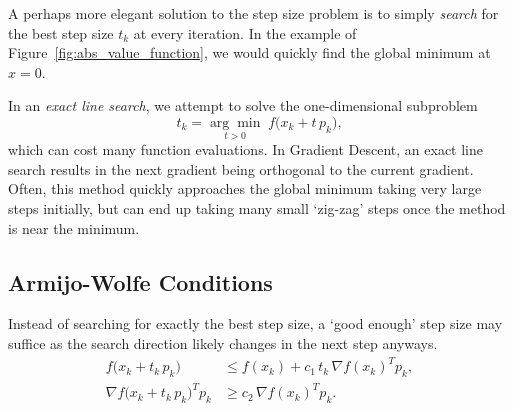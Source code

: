 \documentclass{article}
\begin{document}
A perhaps more elegant solution to the step size problem
is to simply \emph{search} for the best step size $t_k$
at every iteration.
In the example of Figure~\ref{fig:abs_value_function},
we would quickly find the global minimum at $x = 0$.





In an \emph{exact line search}, we attempt to solve the one-dimensional
subproblem
\begin{equation}
    t_k = \underset{t > 0}{\arg\min} \; f\bigl(x_k + t\, p_k\bigr),
\end{equation}
which can cost many function evaluations.
In Gradient Descent, an exact line search results in the
next gradient being orthogonal to the current gradient.
Often, this method quickly approaches the global minimum
taking very large steps initially, but can end up
taking many small
`zig-zag' steps once the method is near the minimum.

\subsection{Armijo-Wolfe Conditions}
Instead of searching for exactly the best step size, a `good enough'
step size may suffice as the search direction likely changes in
the next step anyways.
\begin{align}
    f\bigl(x_k + t_k\,p_k\bigr)              & \le f(x_k)
    + c_1\, t_k \,\nabla f(x_k)^T p_k, \tag{Armijo}                                       \\[6pt]
    \nabla f\bigl(x_k + t_k\,p_k\bigr)^T p_k & \ge c_2 \,\nabla f(x_k)^T p_k. \tag{Wolfe}
\end{align}
\end{document}
